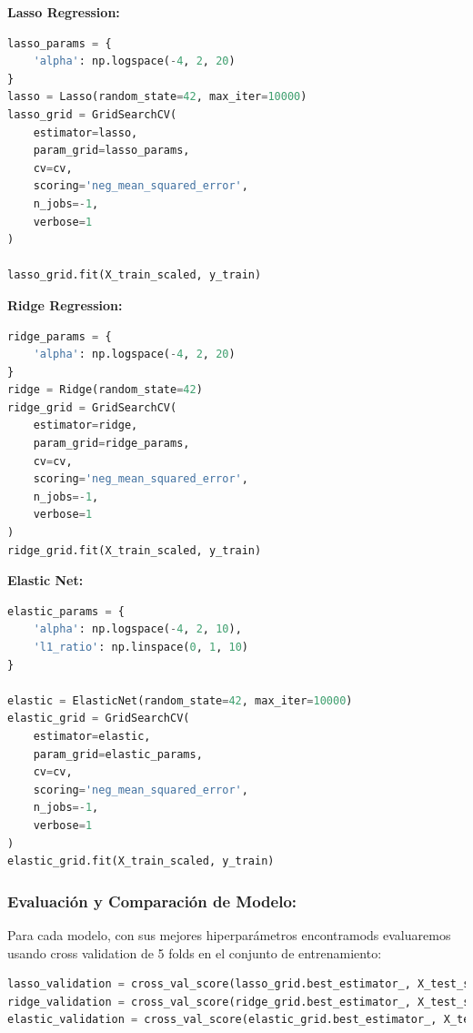 \documentclass[12pt,a4paper]{article}
\begin{document}
\vspace{0.5cm}

\textbf{Lasso Regression:}

\begin{lstlisting}[language=Python, frame=single, basicstyle=\ttfamily\small, breaklines=true]
lasso_params = {
    'alpha': np.logspace(-4, 2, 20)
}
lasso = Lasso(random_state=42, max_iter=10000)
lasso_grid = GridSearchCV(
    estimator=lasso,
    param_grid=lasso_params,
    cv=cv,
    scoring='neg_mean_squared_error',
    n_jobs=-1,
    verbose=1
)

lasso_grid.fit(X_train_scaled, y_train)
\end{lstlisting}

\textbf{Ridge Regression:}
\begin{lstlisting}[language=Python, frame=single, basicstyle=\ttfamily\small, breaklines=true]
ridge_params = {
    'alpha': np.logspace(-4, 2, 20)
}
ridge = Ridge(random_state=42)
ridge_grid = GridSearchCV(
    estimator=ridge,
    param_grid=ridge_params,
    cv=cv,
    scoring='neg_mean_squared_error',
    n_jobs=-1,
    verbose=1
)
ridge_grid.fit(X_train_scaled, y_train)
\end{lstlisting}

\vspace{0.5cm}

\textbf{Elastic Net:}
\begin{lstlisting}[language=Python, frame=single, basicstyle=\ttfamily\small, breaklines=true]
elastic_params = {
    'alpha': np.logspace(-4, 2, 10),
    'l1_ratio': np.linspace(0, 1, 10)
}

elastic = ElasticNet(random_state=42, max_iter=10000)
elastic_grid = GridSearchCV(
    estimator=elastic,
    param_grid=elastic_params,
    cv=cv,
    scoring='neg_mean_squared_error',
    n_jobs=-1,
    verbose=1
)
elastic_grid.fit(X_train_scaled, y_train)
\end{lstlisting}

\subsubsection{Evaluación y Comparación de Modelo:}
Para cada modelo, con sus mejores hiperparámetros encontramods evaluaremos usando cross validation de 5 folds en el conjunto de entrenamiento:

\vspace{0.5cm}

\begin{lstlisting}[language=Python, frame=single, basicstyle=\ttfamily\small, breaklines=true]
lasso_validation = cross_val_score(lasso_grid.best_estimator_, X_test_scaled, y_test, cv=5, scoring='neg_mean_squared_error')
ridge_validation = cross_val_score(ridge_grid.best_estimator_, X_test_scaled, y_test, cv=5, scoring='neg_mean_squared_error')
elastic_validation = cross_val_score(elastic_grid.best_estimator_, X_test_scaled, y_test, cv=5, scoring='neg_mean_squared_error')
\end{lstlisting}
\end{document}
